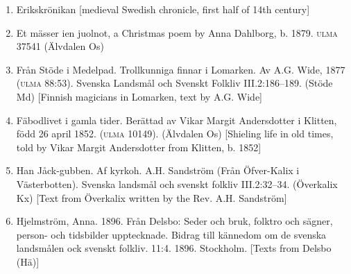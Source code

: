 \begin{enumerate}

\item[\sqbrSenum]

\label{bkm:Ref154220139}Erikskrönikan [medieval Swedish chronicle, first half of 14th century]


\item[\sqbrSenum]

Et mässer ien juolnot, a Christmas poem by Anna Dahlborg, b. 1879. \textsc{ulma} 37541 (Älvdalen Os)

\item[\sqbrSenum]

\label{bkm:Ref154302565}Från Stöde i Medelpad. Trollkunniga finnar i Lomarken. Av A.G. Wide, 1877 (\textsc{ulma} 88:53). Svenska Landsmål och Svenskt Folkliv III.2:186--189. (Stöde Md) [Finnish magicians in Lomarken, text by A.G. Wide]

\item[\sqbrSenum]

\label{bkm:Ref137882894}Fäbodlivet i gamla tider. Berättad av Vikar Margit Andersdotter i Klitten, född 26 april 1852. (\textsc{ulma} 10149). (Älvdalen Os) [Shieling life in old times, told by Vikar Margit Andersdotter from Klitten, b. 1852]

\item[\sqbrSenum]

\label{bkm:Ref137882216}Han Jåck-gubben. Af kyrkoh. A.H. Sandström (Från Öfver-Kalix i Västerbotten). Svenska landsmål och svenskt folkliv III.2:32--34. (Överkalix Kx) [Text from Överkalix written by the Rev. A.H. Sandström]


\item[\sqbrSenum]

\label{bkm:Ref150576370}Hjelmström, Anna. 1896. Från Delsbo: Seder och bruk, folktro och sägner, person- och tidsbilder upptecknade. Bidrag till kännedom om de svenska landsmålen ock svenskt folkliv. 11:4. 1896. Stockholm. [Texts from Delsbo (Hä)]


\end{enumerate}
